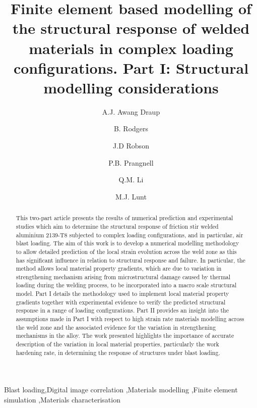 \begin{frontmatter}
\title{Finite element based modelling of the structural response of welded materials in complex loading configurations. %
Part I: Structural modelling considerations}
\author[1]{A.J. Awang Draup }
\author[1]{B. Rodgers}
\author[1]{J.D Robson}
\author[1]{P.B. Prangnell}
\author[1]{Q.M. Li}
\address[1]{The University of Manchester, Manchester, M13 9PL, UK}
\author[2]{M.J. Lunt}
\address[2]{DSTL, Porton, SP4 0JQ, UK}

\begin{abstract}
This two-part article presents the results of numerical  prediction and experimental studies which aim to determine the structural response of friction stir welded aluminium 2139-T8 subjected to complex loading configurations, and in particular, air blast loading. The aim of this work is to develop a numerical modelling methodology to allow detailed prediction of the local strain evolution across the weld zone as this has significant influence in relation to structural response and failure. In particular, the method allows local material property gradients, which are due to variation in strengthening mechanism arising from microstructural damage caused by thermal loading during the welding process, to be incorporated into a macro scale structural model. Part I details the methodology used to implement local material property gradients together with experimental evidence to verify the predicted structural response in a range of loading configurations. Part II provides an insight into the assumptions made in Part I with respect to high strain rate materials modelling across the weld zone and the associated evidence for the variation in strengthening mechanisms in the alloy. The work presented highlights the importance of accurate description of the variation in local material properties, particularly the work hardening rate, in determining the response of structures under blast loading.
\end{abstract}

\begin{keyword}
Blast loading\sep Digital image correlation \sep Materials modelling \sep Finite element simulation \sep Materials characterisation
\end{keyword}

\end{frontmatter}

